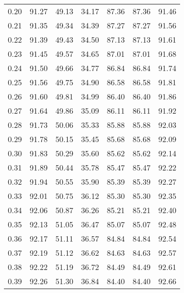 \begin{tabular}{|c|c|c|c|c|c|c|}
      0.20 &     91.27 &     49.13 &      34.17 &   87.36 &      87.36 &         91.46 \\
      0.21 &     91.35 &     49.34 &      34.39 &   87.27 &      87.27 &         91.56 \\
      0.22 &     91.39 &     49.43 &      34.50 &   87.13 &      87.13 &         91.61 \\
      0.23 &     91.45 &     49.57 &      34.65 &   87.01 &      87.01 &         91.68 \\
      0.24 &     91.50 &     49.66 &      34.77 &   86.84 &      86.84 &         91.74 \\
      0.25 &     91.56 &     49.75 &      34.90 &   86.58 &      86.58 &         91.81 \\
      0.26 &     91.60 &     49.81 &      34.99 &   86.40 &      86.40 &         91.86 \\
      0.27 &     91.64 &     49.86 &      35.09 &   86.11 &      86.11 &         91.92 \\
      0.28 &     91.73 &     50.06 &      35.33 &   85.88 &      85.88 &         92.03 \\
      0.29 &     91.78 &     50.15 &      35.45 &   85.68 &      85.68 &         92.09 \\
      0.30 &     91.83 &     50.29 &      35.60 &   85.62 &      85.62 &         92.14 \\
      0.31 &     91.89 &     50.44 &      35.78 &   85.47 &      85.47 &         92.22 \\
      0.32 &     91.94 &     50.55 &      35.90 &   85.39 &      85.39 &         92.27 \\
      0.33 &     92.01 &     50.75 &      36.12 &   85.30 &      85.30 &         92.35 \\
      0.34 &     92.06 &     50.87 &      36.26 &   85.21 &      85.21 &         92.40 \\
      0.35 &     92.13 &     51.05 &      36.47 &   85.07 &      85.07 &         92.48 \\
      0.36 &     92.17 &     51.11 &      36.57 &   84.84 &      84.84 &         92.54 \\
      0.37 &     92.19 &     51.12 &      36.62 &   84.63 &      84.63 &         92.57 \\
      0.38 &     92.22 &     51.19 &      36.72 &   84.49 &      84.49 &         92.61 \\
      0.39 &     92.26 &     51.30 &      36.84 &   84.40 &      84.40 &         92.66 \\

\end{tabular}
